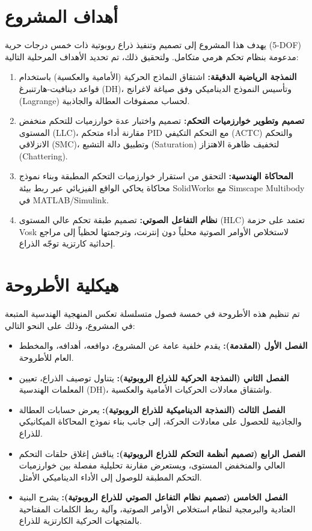 \section{أهداف المشروع}
يهدف هذا المشروع إلى تصميم وتنفيذ ذراع روبوتية ذات خمس درجات حرية (\textenglish{5-DOF}) مدعومة بنظام تحكم هرمي متكامل. ولتحقيق ذلك، تم تحديد الأهداف المرحلية التالية:
\begin{enumerate}
    \item \textbf{النمذجة الرياضية الدقيقة:} اشتقاق النماذج الحركية (الأمامية والعكسية) باستخدام قواعد دينافيت-هارتنبرغ (\textenglish{DH})، وتأسيس النموذج الديناميكي وفق صياغة لاغرانج (\textenglish{Lagrange}) لحساب مصفوفات العطالة والجاذبية.
    \item \textbf{تصميم وتطوير خوارزميات التحكم:} تصميم واختبار عدة خوارزميات للتحكم منخفض المستوى (\textenglish{LLC})، مقارنة أداء متحكم \textenglish{PID} مع التحكم التكيفي (\textenglish{ACTC}) والتحكم الانزلاقي (\textenglish{SMC})، وتطبيق دالة التشبع (\textenglish{Saturation}) لتخفيف ظاهرة الاهتزاز (\textenglish{Chattering}).
    \item \textbf{المحاكاة الهندسية:} التحقق من استقرار خوارزميات التحكم المطبقة وبناء نموذج محاكاة يحاكي الواقع الفيزيائي عبر ربط بيئة \textenglish{SolidWorks} مع \textenglish{Simscape Multibody} في \textenglish{MATLAB/Simulink}.
    \item \textbf{نظام التفاعل الصوتي:} تصميم طبقة تحكم عالي المستوى (\textenglish{HLC}) تعتمد على حزمة \textenglish{Vosk} لاستخلاص الأوامر الصوتية محلياً دون إنترنت، وترجمتها لحظياً إلى مراجع إحداثية كارتزية توجّه الذراع.
\end{enumerate}

\section{هيكلية الأطروحة}
تم تنظيم هذه الأطروحة في خمسة فصول متسلسلة تعكس المنهجية الهندسية المتبعة في المشروع، وذلك على النحو التالي:
\begin{itemize}
    \item \textbf{الفصل الأول (المقدمة):} يقدم خلفية عامة عن المشروع، دوافعه، أهدافه، والمخطط العام للأطروحة.
    \item \textbf{الفصل الثاني (النمذجة الحركية للذراع الروبوتية):} يتناول توصيف الذراع، تعيين المعلمات الهندسية (\textenglish{DH})، واشتقاق معادلات الحركيات الأمامية والعكسية.
    \item \textbf{الفصل الثالث (النمذجة الديناميكية للذراع الروبوتية):} يعرض حسابات العطالة والجاذبية للحصول على معادلات الحركة، إلى جانب بناء نموذج المحاكاة الميكانيكي للذراع.
    \item \textbf{الفصل الرابع (تصميم أنظمة التحكم للذراع الروبوتية):} يناقش إغلاق حلقات التحكم العالي والمنخفض المستوى، ويستعرض مقارنة تحليلية مفصلة بين خوارزميات التحكم المطبقة للوصول إلى الأداء الديناميكي الأمثل.
    \item \textbf{الفصل الخامس (تصميم نظام التفاعل الصوتي للذراع الروبوتية):} يشرح البنية العتادية والبرمجية لنظام استخلاص الأوامر الصوتية، وآلية ربط الكلمات المفتاحية بالمتجهات الحركية الكارتزية للذراع.
\end{itemize}